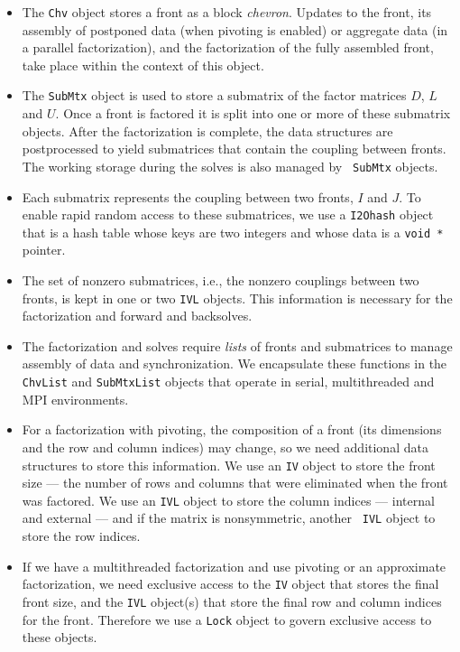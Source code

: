 \begin{itemize}
\item
The {\tt Chv} object stores a front as a block {\it chevron}.
Updates to the front, its assembly of postponed data (when pivoting
is enabled) or aggregate data (in a parallel factorization),
and the factorization of the fully assembled front, take place
within the context of this object.
\item
The {\tt SubMtx} object is used to store a submatrix of the factor
matrices $D$, $L$ and $U$.
Once a front is factored it is split into one or more of these
submatrix objects.
After the factorization is complete, the data structures are
postprocessed to yield submatrices that contain the coupling
between fronts.
The working storage during the solves is also managed by {\tt
SubMtx} objects.
\item
Each submatrix represents the coupling between two fronts,
$I$ and $J$.
To enable rapid random access to these submatrices, we use a
{\tt I2Ohash} object that is a hash table whose keys are two
integers and whose data is a {\tt void *} pointer.
\item
The set of nonzero submatrices, i.e., the nonzero couplings 
between two fronts, is kept in one or two {\tt IVL} objects.
This information is necessary for the factorization and forward and
backsolves.
\item
The factorization and solves require {\it lists} of fronts and
submatrices to manage assembly of data and synchronization.
We encapsulate these functions in the
{\tt ChvList} and {\tt SubMtxList} objects 
that operate in serial, multithreaded and MPI environments.
\item
For a factorization with pivoting, the composition of a front
(its dimensions and the row and column indices) may change, so we
need additional data structures to store this information.
We use an {\tt IV} object to store the front size --- the number of
rows and columns that were eliminated when the front was factored.
We use an {\tt IVL} object to store the column indices --- internal
and external --- and if the matrix is nonsymmetric, another {\tt
IVL} object to store the row indices.
\item
If we have a multithreaded factorization and use pivoting or an
approximate factorization, we need exclusive access
to the {\tt IV} object that stores the final front size,
and the {\tt IVL} object(s) that store the final row and column 
indices for the front.
Therefore we use a {\tt Lock} object to govern exclusive
access to these objects.
\end{itemize}
